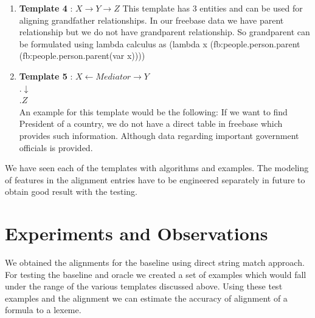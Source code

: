 \documentclass[12pt, a4paper]{article}
\begin{document}
\begin{enumerate}
{\bf formula} = \\"(lambda x (fb:people.person.spouse \\(fb:people.person.gender.female(var x))))"\\
{\bf lexeme} = "wife of"\\
{\bf source} = "ALIGNMENT"\\
{\bf features} = \{FB\_typed\_size :aaa, Intersection\_size\_typed:bbb, "NL-size":ccc\}

The algorithm used to align the formula is still similar to the ones discussed above but we now use a unique lambda function which would represent the formula. This is yet to be implemented and tested.

A few more templates which would be our targets for the end project are discussed with an example.

\item {\bf Template 4} : $X \rightarrow Y \rightarrow Z$
This template has 3 entities and can be used for aligning grandfather relationships. In our freebase data we have parent relationship but we do not have grandparent relationship. So grandparent can be formulated using lambda calculus as (lambda x (fb:people.person.parent (fb:people.person.parent(var x))))

\item {\bf Template 5} : $X\leftarrow Mediator \rightarrow Y$\\
.\qquad\qquad\qquad\qquad\quad$\downarrow$\\
.\qquad\qquad\qquad\qquad\quad$Z$\\
An example for this template would be the following: If we want to find President of a country, we do not have a direct table in freebase which provides such information. Although data regarding important government officials is provided.
	
\end{enumerate}

We have seen each of the templates with algorithms and examples. The modeling of features in the alignment entries have to be engineered separately in future to obtain good result with the testing.

\section{Experiments and Observations}
We obtained the alignments for the baseline using direct string match approach. For testing the baseline and oracle we created a set of examples which would fall under the range of the various templates discussed above. Using these test examples and the alignment we can estimate the accuracy of alignment of a formula to a lexeme.\\
\end{document}
